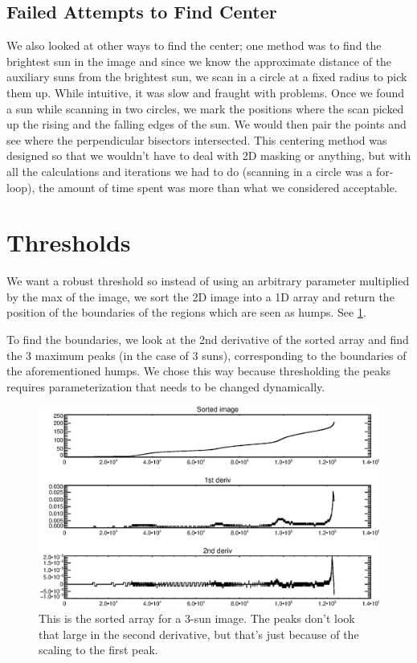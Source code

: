 \documentclass[10pt]{scrartcl}
\begin{document}
\subsection{Failed Attempts to Find Center} %
\label{sub:failed_attempts_to_find_center}
We also looked at other ways to find the center; one method was to find the brightest sun in the image and since we know the approximate distance of the auxiliary suns from the brightest sun, we scan in a circle at a fixed radius to pick them up. While intuitive, it was slow and fraught with problems. Once we found a sun while scanning in two circles, we mark the positions where the scan picked up the rising and the falling edges of the sun. We would then pair the points and see where the perpendicular bisectors intersected. This centering method was designed so that we wouldn't have to deal with 2D masking or anything, but with all the calculations and iterations we had to do (scanning in a circle was a for-loop), the amount of time spent was more than what we considered acceptable. 

\clearpage


\section{Thresholds} %
\label{sec:thresholds}
We want a robust threshold so instead of using an arbitrary parameter multiplied by the max of the image, we sort the 2D image into a 1D array and return the position of the boundaries of the regions which are seen as humps. See \cref{peaks}.

To find the boundaries, we look at the 2nd derivative of the sorted array and find the 3 maximum peaks (in the case of 3 suns), corresponding to the boundaries of the aforementioned humps. We chose this way because thresholding the peaks requires parameterization that needs to be changed dynamically. 

\begin{figure}[!ht]
   \includegraphics[width=.75\textwidth]{../plots_tables_images/sortedarray.eps}%
   \caption{This is the sorted array for a 3-sun image. The peaks don't look that large in the second derivative, but that's just because of the scaling to the first peak.}\label{peaks}
\end{figure}
\end{document}
